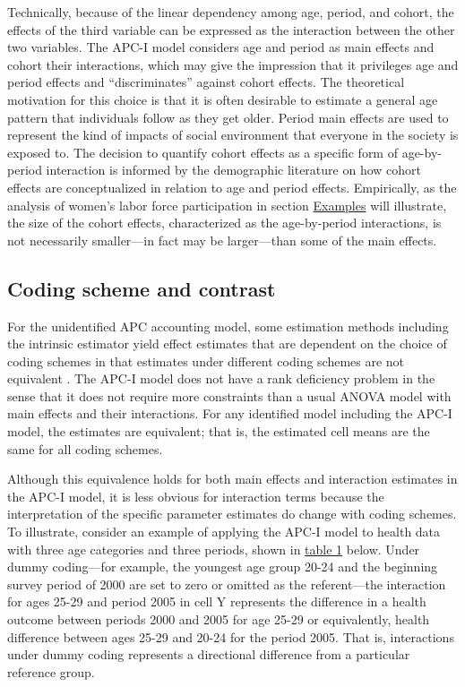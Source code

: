 Technically, because of the linear dependency among age, period, and cohort, the effects of the third variable can be expressed as the interaction between the other two variables.  The APC-I model considers age and period as main effects and cohort their interactions, which may give the impression that it privileges age and period effects and ``discriminates'' against cohort effects.  The theoretical motivation for this choice is that it is often desirable to estimate a general age pattern that individuals follow as they get older.  Period main effects are used to represent the kind of impacts of social environment that everyone in the society is exposed to.  The decision to quantify cohort effects as a specific form of age-by-period interaction is informed by the demographic literature on how cohort effects are conceptualized in relation to age and period effects.  Empirically, as the analysis of women's labor force participation in section \hyperref[example]{Examples} will illustrate, the size of the cohort effects, characterized as the age-by-period interactions, is not necessarily smaller—in fact may be larger—than some of the main effects.  

\subsection{Coding scheme and contrast} \label{contrasts}

For the unidentified APC accounting model, some estimation methods including the intrinsic estimator yield effect estimates that are dependent on the choice of coding schemes in that estimates under different coding schemes are not equivalent \citep[see][for a more detailed discussion]{luo_sensitivity_2016, te_grotenhuis_intrinsic_2016}. The APC-I model does not have a rank deficiency problem in the sense that it does not require more constraints than a usual ANOVA model with main effects and their interactions.  For any identified model including the APC-I model, the estimates are equivalent; that is, the estimated cell means are the same for all coding schemes.  

Although this equivalence holds for both main effects and interaction estimates in the APC-I model, it is less obvious for interaction terms because the interpretation of the specific parameter estimates do change with coding schemes.  To illustrate, consider an example of applying the APC-I model to health data with three age categories and three periods, shown in \hyperref[table:1]{table 1} below.  Under dummy coding—for example, the youngest age group 20-24 and the beginning survey period of 2000 are set to zero or omitted as the referent—the interaction for ages 25-29 and period 2005 in cell Y represents the difference in a health outcome between periods 2000 and 2005 for age 25-29 or equivalently, health difference between ages 25-29 and 20-24 for the period 2005.  That is, interactions under dummy coding represents a directional difference from a particular reference group.  

